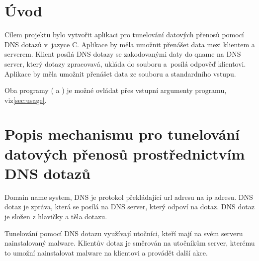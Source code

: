 
\section{Úvod}
\label{sec:uvod}
Cílem projektu bylo vytvořit aplikaci pro tunelování datových přenosů pomocí
DNS dotazů v~jazyce C\@. Aplikace by měla umožnit přenášet data mezi klientem
a serverem.
Klient posílá DNS dotazy se zakodovanými daty do qname na DNS server,
který dotazy zpracovavá, ukláda do souboru a~posílá odpověď klientovi.
Aplikace by měla umožnit přenášet data ze souboru a standardního vstupu.

Oba programy ( a ) je možné
ovládat přes vstupní argumenty programu, viz\ref{sec:usage}.



\section{Popis mechanismu pro tunelování datových přenosů prostřednictvím DNS dotazů}
\label{sec:popis-mechanismu-pro-tunelovani-datovych-prenosu-prostrednictvim-dns-dotazu}

Domain name system, DNS je protokol překládající url adresu na ip adresu.
DNS dotaz je zpráva, která se posílá na DNS server, který odpoví na dotaz.
DNS dotaz je složen z hlavičky a těla dotazu\cite{dnsPacket}.

Tunelování pomocí DNS dotazu využívají utočníci, kteří
mají na svém serveru nainstalovaný malware.
Klientův dotaz je směrován na utočníkům server, kterému to umožní
nainstalovat malware na klientovi a provádět další akce.
